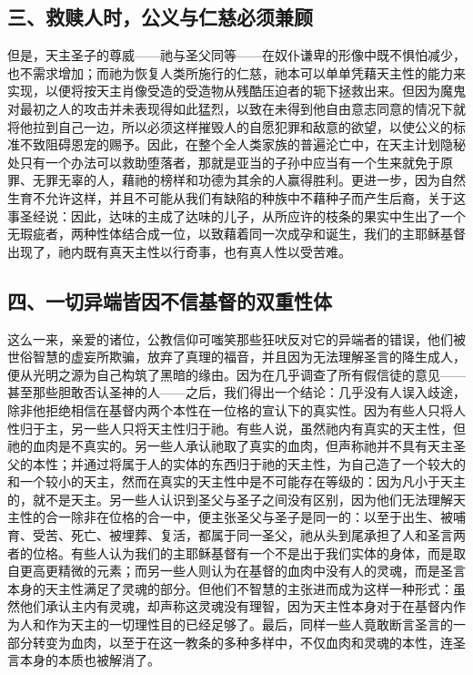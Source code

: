 
\subsection{三、救赎人时，公义与仁慈必须兼顾}

但是，天主圣子的尊威——祂与圣父同等——在奴仆谦卑的形像中既不惧怕减少，也不需求增加；而祂为恢复人类所施行的仁慈，祂本可以单单凭藉天主性的能力来实现，以便将按天主肖像受造的受造物从残酷压迫者的轭下拯救出来。但因为魔鬼对最初之人的攻击并未表现得如此猛烈，以致在未得到他自由意志同意的情况下就将他拉到自己一边，所以必须这样摧毁人的自愿犯罪和敌意的欲望，以使公义的标准不致阻碍恩宠的赐予。因此，在整个全人类家族的普遍沦亡中，在天主计划隐秘处只有一个办法可以救助堕落者，那就是亚当的子孙中应当有一个生来就免于原罪、无罪无辜的人，藉祂的榜样和功德为其余的人赢得胜利。更进一步，因为自然生育不允许这样，并且不可能从我们有缺陷的种族中不藉种子而产生后裔，关于这事圣经说：因此，达味的主成了达味的儿子，从所应许的枝条的果实中生出了一个无瑕疵者，两种性体结合成一位，以致藉着同一次成孕和诞生，我们的主耶稣基督出现了，祂内既有真天主性以行奇事，也有真人性以受苦难。\par


\subsection{四、一切异端皆因不信基督的双重性体}

这么一来，亲爱的诸位，公教信仰可嗤笑那些狂吠反对它的异端者的错误，他们被世俗智慧的虚妄所欺骗，放弃了真理的福音，并且因为无法理解圣言的降生成人，便从光明之源为自己构筑了黑暗的缘由。因为在几乎调查了所有假信徒的意见——甚至那些胆敢否认圣神的人——之后，我们得出一个结论：几乎没有人误入歧途，除非他拒绝相信在基督内两个本性在一位格的宣认下的真实性。因为有些人只将人性归于主，另一些人只将天主性归于祂。有些人说，虽然祂内有真实的天主性，但祂的血肉是不真实的。另一些人承认祂取了真实的血肉，但声称祂并不具有天主圣父的本性；并通过将属于人的实体的东西归于祂的天主性，为自己造了一个较大的和一个较小的天主，然而在真实的天主性中是不可能存在等级的：因为凡小于天主的，就不是天主。另一些人认识到圣父与圣子之间没有区别，因为他们无法理解天主性的合一除非在位格的合一中，便主张圣父与圣子是同一的：以至于出生、被哺育、受苦、死亡、被埋葬、复活，都属于同一圣父，祂从头到尾承担了人和圣言两者的位格。有些人认为我们的主耶稣基督有一个不是出于我们实体的身体，而是取自更高更精微的元素；而另一些人则认为在基督的血肉中没有人的灵魂，而是圣言本身的天主性满足了灵魂的部分。但他们不智慧的主张进而成为这样一种形式：虽然他们承认主内有灵魂，却声称这灵魂没有理智，因为天主性本身对于在基督内作为人和作为天主的一切理性目的已经足够了。最后，同样一些人竟敢断言圣言的一部分转变为血肉，以至于在这一教条的多种多样中，不仅血肉和灵魂的本性，连圣言本身的本质也被解消了。\par

